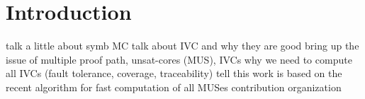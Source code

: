 \section{Introduction}
\label{sec:intro}

talk a little about symb MC
talk about IVC and why they are good
bring up the issue of multiple proof path, unsat-cores (MUS), IVCs
why we need to compute all IVCs (fault tolerance, coverage, traceability)
tell this work is based on the recent algorithm for fast computation of all MUSes
contribution
organization

